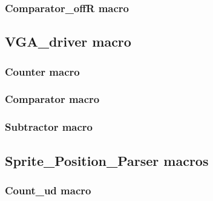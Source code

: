 \documentclass[a4paper]{article}
\begin{document}
    
    
    
    
\subsubsection{Comparator\_offR macro}


\subsection{VGA\_driver macro}


\subsubsection{Counter macro}


\subsubsection{Comparator macro}


\subsubsection{Subtractor macro}


\subsection{Sprite\_Position\_Parser macros}
\subsubsection{Count\_ud macro}

\end{document}
